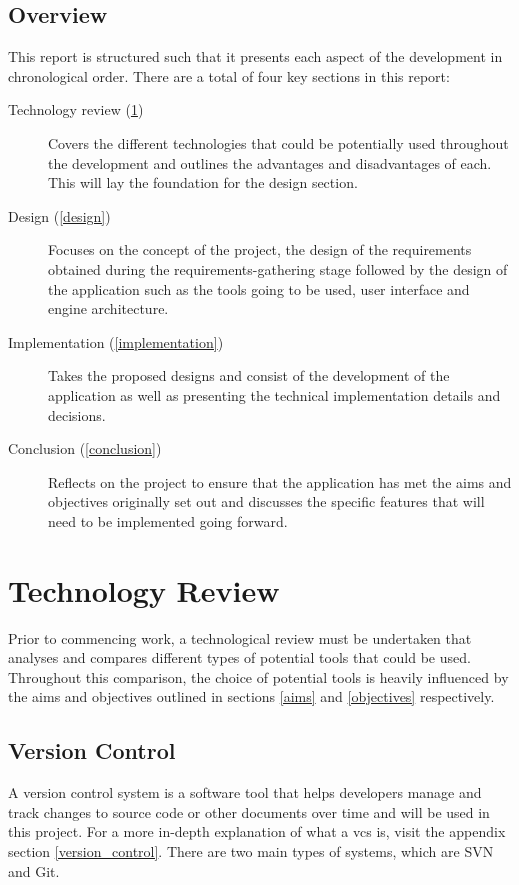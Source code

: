\documentclass[11pt]{article}
\begin{document}
\subsection{Overview}
This report is structured such that it presents each aspect of the development
in chronological order. There are a total of four key sections in this report:
\begin{description}
  \item[Technology review (\ref{technology_review})] Covers the different
    technologies that could be potentially used throughout the development and
    outlines the advantages and disadvantages of each. This will lay the
    foundation for the design section.
  \item[Design (\ref{design})] Focuses on the concept of the project, the design
    of the requirements obtained during the requirements-gathering stage
    followed by the design of the application such as the tools going to be
    used, user interface and engine architecture.
  \item[Implementation (\ref{implementation})] Takes the proposed designs and
    consist of the development of the application as well as presenting the
    technical implementation details and decisions.
  \item[Conclusion (\ref{conclusion})] Reflects on the project to ensure that
    the application has met the aims and objectives originally set out and
    discusses the specific features that will need to be implemented going
    forward.
\end{description}

\clearpage
\section{Technology Review} \label{technology_review}
Prior to commencing work, a technological review must be undertaken that
analyses and compares different types of potential tools that could be used.
Throughout this comparison, the choice of potential tools is heavily influenced
by the aims and objectives outlined in sections \ref{aims} and \ref{objectives}
respectively.


\subsection{Version Control}
A version control system is a software tool that helps developers manage and
track changes to source code or other documents over time and will be used in
this project. For a more in-depth explanation of what a \gls*{vcs} is, visit the
appendix section \ref{version_control}. There are two main types of systems,
which are SVN and Git.
\end{document}
